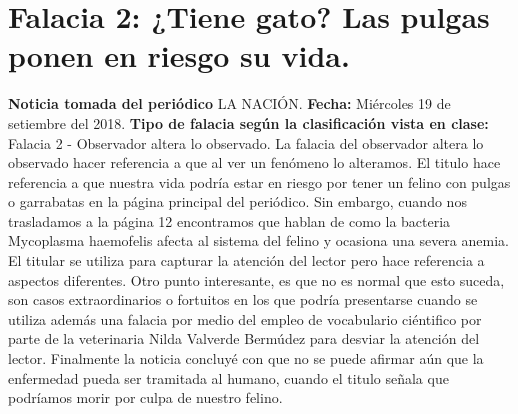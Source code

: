 \documentclass[11pt,a4paper,titlepage]{article}
\begin{document}
{\section{Falacia 2: ¿Tiene gato? Las pulgas ponen en riesgo su vida. }{%
\textbf{Noticia tomada del periódico} LA NACIÓN.
\newline
\textbf{Fecha:} Miércoles 19 de setiembre del 2018.
\newline
\textbf{Tipo de falacia según la clasificación vista en clase:} 
\newline
Falacia 2 - Observador altera lo observado.
\newline
\newline
La falacia del observador altera lo observado hacer referencia a que al ver un fen\'omeno lo alteramos.
\newline
El titulo hace referencia a que nuestra vida podría estar en riesgo por tener un felino con pulgas o garrabatas en la página principal del periódico. Sin embargo, cuando nos trasladamos a la página 12 encontramos que hablan de como la bacteria Mycoplasma haemofelis afecta al sistema del felino y ocasiona una severa anemia. El titular se utiliza para capturar la atención del lector pero hace referencia a aspectos diferentes.
\newline
Otro punto interesante, es que no es normal que esto suceda, son casos extraordinarios o fortuitos en los que podr\'ia presentarse cuando se utiliza adem\'as una falacia por medio del empleo de vocabulario ci\'entifico por parte de la veterinaria Nilda Valverde Berm\'udez para desviar la atenci\'on del lector.
\newline
Finalmente la noticia concluy\'e con que no se puede afirmar a\'un que la enfermedad pueda ser tramitada al humano, cuando el titulo se\~nala que podr\'iamos morir por culpa de nuestro felino.


}}
\end{document}
